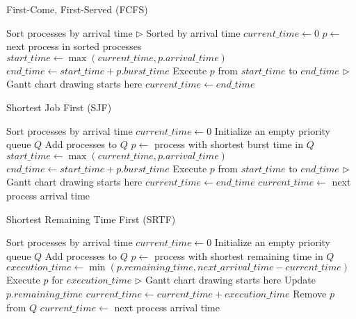 \documentclass{article}
\begin{document}
\begin{algorithm}
\caption{First-Come, First-Served (FCFS)}
\begin{algorithmic}[1]
\State Sort processes by arrival time $\triangleright$ Sorted by arrival time
\State $current\_time \gets 0$
    \State $p \gets$ next process in sorted processes
    \State $start\_time \gets \max(current\_time, p.arrival\_time)$
    \State $end\_time \gets start\_time + p.burst\_time$
    \State Execute $p$ from $start\_time$ to $end\_time$ $\triangleright$ Gantt chart drawing starts here
    \State $current\_time \gets end\_time$
\EndWhile
\end{algorithmic}
\end{algorithm}

\begin{algorithm}
\caption{Shortest Job First (SJF)}
\begin{algorithmic}[1]
\State Sort processes by arrival time
\State $current\_time \gets 0$
\State Initialize an empty priority queue $Q$
        \State Add processes to $Q$
    \EndWhile
        \State $p \gets$ process with shortest burst time in $Q$
        \State $start\_time \gets \max(current\_time, p.arrival\_time)$
        \State $end\_time \gets start\_time + p.burst\_time$
        \State Execute $p$ from $start\_time$ to $end\_time$ $\triangleright$ Gantt chart drawing starts here
        \State $current\_time \gets end\_time$
    \Else
        \State $current\_time \gets$ next process arrival time
    \EndIf
\EndWhile
\end{algorithmic}
\end{algorithm}

\begin{algorithm}
\caption{Shortest Remaining Time First (SRTF)}
\begin{algorithmic}[1]
\State Sort processes by arrival time
\State $current\_time \gets 0$
\State Initialize an empty priority queue $Q$
        \State Add processes to $Q$
    \EndWhile
        \State $p \gets$ process with shortest remaining time in $Q$
        \State $execution\_time \gets \min(p.remaining\_time, next\_arrival\_time - current\_time)$
        \State Execute $p$ for $execution\_time$ $\triangleright$ Gantt chart drawing starts here
        \State Update $p.remaining\_time$
        \State $current\_time \gets current\_time + execution\_time$
            \State Remove $p$ from $Q$
        \EndIf
    \Else
        \State $current\_time \gets$ next process arrival time
    \EndIf
\EndWhile
\end{algorithmic}
\end{algorithm}
\end{document}
